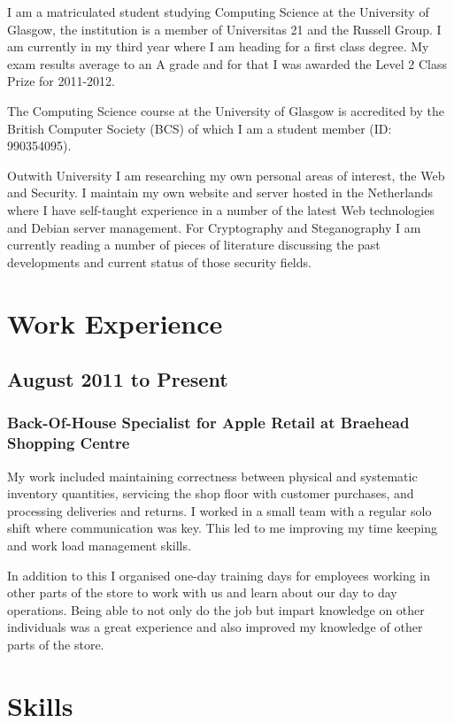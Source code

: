\documentclass[11pt,a4paper]{article}
\begin{document}
I am a matriculated student studying Computing Science at the University of 
Glasgow, the institution is a member of Universitas 21 and the Russell Group.
I am currently in my third year where I am heading for a first class degree. 
My exam results average to an A grade and for that I was awarded the Level 2
Class Prize for 2011-2012.

The Computing Science course at the University of Glasgow is accredited by the
British Computer Society (BCS) of which I am a student member (ID: 990354095).

Outwith University I am researching my own personal areas of interest, the
Web and Security. I maintain my own website and server hosted in the
Netherlands where I have self-taught experience in a number of the latest Web
technologies and Debian server management. For Cryptography and Steganography
I am currently reading a number of pieces of literature discussing the past
developments and current status of those security fields.

\section*{Work Experience}

\subsection*{August 2011 to Present}

\subsubsection*{Back-Of-House Specialist for Apple Retail at Braehead 
Shopping Centre}

My work included maintaining correctness between physical and systematic 
inventory quantities, servicing the shop floor with customer purchases, and 
processing deliveries and returns. I worked in a small team with a regular 
solo shift where communication was key. This led to me improving my time 
keeping and work load management skills.

In addition to this I organised one-day training days for employees working in 
other parts of the store to work with us and learn about our day to day 
operations. Being able to not only do the job but impart knowledge on other 
individuals was a great experience and also improved my knowledge of other 
parts of the store.

\section*{Skills}
\end{document}

